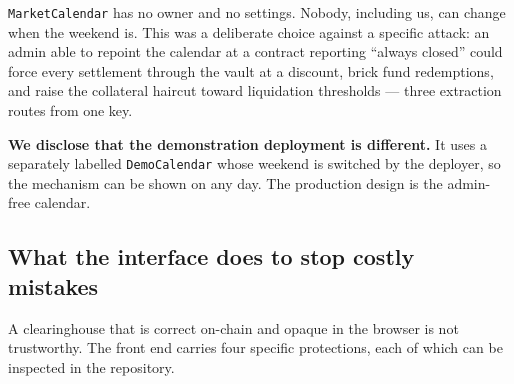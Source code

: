\documentclass[11pt,a4paper]{article}
\begin{document}
\texttt{MarketCalendar} has no owner and no settings. Nobody, including us, can change when the
weekend is. This was a deliberate choice against a specific attack: an admin able to repoint the
calendar at a contract reporting ``always closed'' could force every settlement through the vault at
a discount, brick fund redemptions, and raise the collateral haircut toward liquidation thresholds —
three extraction routes from one key.

\textbf{We disclose that the demonstration deployment is different.} It uses a separately labelled
\texttt{DemoCalendar} whose weekend is switched by the deployer, so the mechanism can be shown on any
day. The production design is the admin-free calendar.

\subsection{What the interface does to stop costly mistakes}

A clearinghouse that is correct on-chain and opaque in the browser is not trustworthy. The front end
carries four specific protections, each of which can be inspected in the repository.
\end{document}
